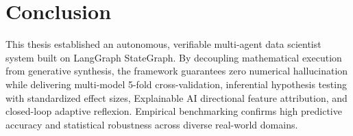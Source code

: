 \documentclass[10pt,journal,compsoc]{IEEEtran}
\begin{document}
\section{Conclusion}
This thesis established an autonomous, verifiable multi-agent data scientist system built on LangGraph StateGraph. By decoupling mathematical execution from generative synthesis, the framework guarantees zero numerical hallucination while delivering multi-model 5-fold cross-validation, inferential hypothesis testing with standardized effect sizes, Explainable AI directional feature attribution, and closed-loop adaptive reflexion. Empirical benchmarking confirms high predictive accuracy and statistical robustness across diverse real-world domains.



\end{document}
